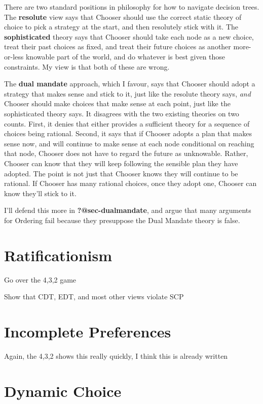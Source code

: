 \documentclass[
  10pt,
  letterpaper,
  DIV=11,
  numbers=noendperiod,
  twoside]{scrartcl}
\begin{document}
There are two standard positions in philosophy for how to navigate
decision trees. The \textbf{resolute} view says that Chooser should use
the correct static theory of choice to pick a strategy at the start, and
then resolutely stick with it. The \textbf{sophisticated} theory says
that Chooser should take each node as a new choice, treat their past
choices as fixed, and treat their future choices as another more-or-less
knowable part of the world, and do whatever is best given those
constraints. My view is that both of these are wrong.

The \textbf{dual mandate} approach, which I favour, says that Chooser
should adopt a strategy that makes sense and stick to it, just like the
resolute theory says, \emph{and} Chooser should make choices that make
sense at each point, just like the sophisticated theory says. It
disagrees with the two existing theories on two counts. First, it denies
that either provides a sufficient theory for a sequence of choices being
rational. Second, it says that if Chooser adopts a plan that makes sense
now, and will continue to make sense at each node conditional on
reaching that node, Chooser does not have to regard the future as
unknowable. Rather, Chooser can know that they will keep following the
sensible plan they have adopted. The point is not just that Chooser
knows they will continue to be rational. If Chooser has many rational
choices, once they adopt one, Chooser can know they'll stick to it.

I'll defend this more in \textbf{?@sec-dualmandate}, and argue that many
arguments for Ordering fail because they presuppose the Dual Mandate
theory is false.

\section{Ratificationism}\label{sec-ratify}

Go over the 4,3,2 game

Show that CDT, EDT, and most other views violate SCP

\section{Incomplete Preferences}\label{incomplete-preferences}

Again, the 4,3,2 shows this really quickly, I think this is already
written

\section{Dynamic Choice}\label{dynamic-choice}
\end{document}

